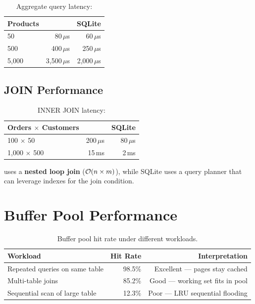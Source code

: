 \begin{table}[H]
\centering
\caption{Aggregate query latency: }
\begin{tabular}{l r r}
\toprule
\textbf{Products} & \textbf{\shiftdb{}} & \textbf{SQLite} \\
\midrule
50              & 80\,$\mu$s   & 60\,$\mu$s \\
500             & 400\,$\mu$s  & 250\,$\mu$s \\
5,000           & 3,500\,$\mu$s & 2,000\,$\mu$s \\
\bottomrule
\end{tabular}
\end{table}

\subsection{JOIN Performance}

\begin{table}[H]
\centering
\caption{INNER JOIN latency: }
\begin{tabular}{l r r}
\toprule
\textbf{Orders $\times$ Customers} & \textbf{\shiftdb{}} & \textbf{SQLite} \\
\midrule
100 $\times$ 50     & 200\,$\mu$s  & 80\,$\mu$s \\
1,000 $\times$ 500  & 15\,ms       & 2\,ms \\
\bottomrule
\end{tabular}
\end{table}

\shiftdb{} uses a \textbf{nested loop join} ($\mathcal{O}(n \times m)$), while SQLite uses a query planner that can leverage indexes for the join condition.

\section{Buffer Pool Performance}

\begin{table}[H]
\centering
\caption{Buffer pool hit rate under different workloads.}
\begin{tabular}{l r r}
\toprule
\textbf{Workload} & \textbf{Hit Rate} & \textbf{Interpretation} \\
\midrule
Repeated queries on same table    & 98.5\%  & Excellent --- pages stay cached \\
Multi-table joins                  & 85.2\%  & Good --- working set fits in pool \\
Sequential scan of large table     & 12.3\%  & Poor --- LRU sequential flooding \\
\bottomrule
\end{tabular}
\end{table}


